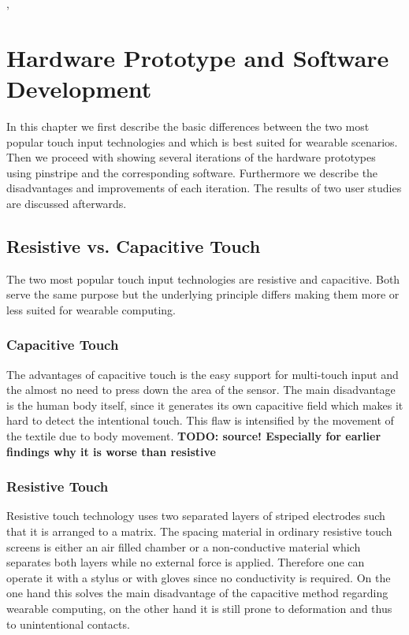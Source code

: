 ,%
%
\chapter{Hardware Prototype and Software Development}
\label{Hardware Prototype and Software Development} 
In this chapter we first describe the basic differences between the two most popular touch input technologies and which is best suited for wearable scenarios. Then we proceed with showing several iterations of the hardware prototypes using pinstripe and the corresponding software. Furthermore we describe the disadvantages and improvements of each iteration. The results of two user studies are discussed afterwards. 
\section{Resistive vs. Capacitive Touch}
The two most popular touch input technologies are resistive and capacitive. Both serve the same purpose but the underlying principle differs making them more or less suited for wearable computing. 
\subsection{Capacitive Touch}

The advantages of capacitive touch is the easy support for multi-touch input and the almost no need to press down the area of the sensor. The main disadvantage is the human body itself, since  it generates its own capacitive field which makes it hard to detect the intentional touch. This flaw is intensified by the movement of the textile due to body movement. \textbf{TODO: source! Especially for earlier findings why it is worse than resistive}

\subsection{Resistive Touch}
Resistive touch technology uses two separated layers of striped electrodes such that it is arranged to a matrix. The spacing material in ordinary resistive touch screens is either an air filled chamber or a non-conductive material which separates both layers while no external force is applied. Therefore one can operate it with a stylus or with gloves since no conductivity is required. On the one hand this solves the main disadvantage of the capacitive method regarding wearable computing, on the other hand it is still prone to deformation and thus to unintentional contacts.

